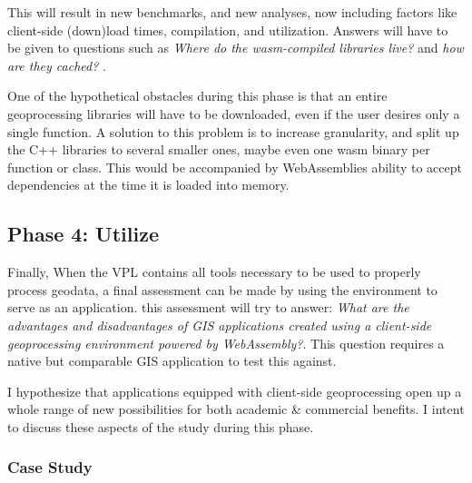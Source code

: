 This will result in new benchmarks, and new analyses, now including factors like client-side (down)load times, compilation, and utilization. Answers will have to be given to questions such as \textit{Where do the wasm-compiled libraries live?} and \textit{ how are they cached? }.

One of the hypothetical obstacles during this phase is that an entire geoprocessing libraries will have to be downloaded, even if the user desires only a single function. A solution to this problem is to increase granularity, and split up the C++ libraries to several smaller ones, maybe even one wasm binary per function or class. This would be accompanied by WebAssemblies ability to accept dependencies at the time it is loaded into memory. 




\subsection{Phase 4: Utilize}

Finally, When the VPL contains all tools necessary to be used to properly process geodata, a final assessment can be made by using the environment to serve as an application. this assessment will try to answer: \textit{What are the advantages and disadvantages of GIS applications created using a client-side geoprocessing environment powered by WebAssembly?}. This question requires a native but comparable GIS application to test this against.  


I hypothesize that applications equipped with client-side geoprocessing open up a whole range of new possibilities for both academic \& commercial benefits. 
I intent to discuss these aspects of the study during this phase. 




\subsubsection*{Case Study}

